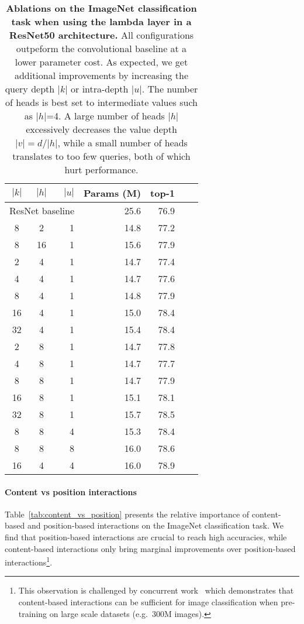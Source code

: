 \documentclass{article} \usepackage{iclr2021_conference,times}
\begin{document}
\begin{table}[h]
  \begin{center}
  \small
  \begin{tabular}{ccrrrrr}
    \toprule
    $|k|$ & $|h|$ & $|u|$ & Params (M) & top-1 \\
    \midrule
    \multicolumn{3}{c}{ResNet baseline} & 25.6 & 76.9 \\
    \midrule
    8 & 2 & 1 & 14.8 & 77.2 \\
    8 & 16 & 1 & 15.6 & 77.9 \\
    \midrule
    2 & 4 & 1 & 14.7 & 77.4 \\
    4 & 4 & 1 & 14.7 & 77.6 \\
    8 & 4 & 1 & 14.8 & 77.9 \\
    16 & 4 & 1 & 15.0 & 78.4 \\
    32 & 4 & 1 & 15.4 & 78.4 \\
    \midrule
    2 & 8 & 1 & 14.7 & 77.8 \\
    4 & 8 & 1 & 14.7 & 77.7 \\
    8 & 8 & 1 & 14.7 & 77.9 \\
    16 & 8 & 1 & 15.1 & 78.1 \\
    32 & 8 & 1 & 15.7 & 78.5 \\
    \midrule
    8 & 8 & 4 & 15.3 & 78.4 \\
    8 & 8 & 8 & 16.0 & 78.6 \\
    16 & 4 & 4 & 16.0 & 78.9 \\
    \bottomrule
  \end{tabular}
  \caption{
  \textbf{Ablations on the ImageNet classification task when using the lambda layer in a ResNet50 architecture.}
  All configurations outpeform the convolutional baseline at a lower parameter cost.
  As expected, we get additional improvements by increasing the query depth $|k|$ or intra-depth $|u|$. 
  The number of heads is best set to intermediate values such as $|h|$=4.
  A large number of heads $|h|$ excessively decreases the value depth $|v|=d/|h|$, while a small number of heads translates to too few queries, both of which hurt performance.
  }
  \label{tab:ablations}
  \end{center}
\end{table}

\vspace{-0.1cm}
\paragraph{Content vs position interactions\label{sec:content_vs_position}}
Table~\ref{tab:content_vs_position} presents the relative importance of content-based and position-based interactions on the ImageNet classification task.
We find that position-based interactions are crucial to reach high accuracies, while content-based interactions only bring marginal improvements over position-based interactions\footnote{This observation is challenged by concurrent work~\citep{dosovitskiy2020image} which demonstrates that content-based interactions can be sufficient for image classification when pre-training on large scale datasets (e.g.\ 300M images).}.
\end{document}
